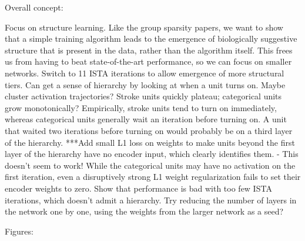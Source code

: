 Overall concept:

Focus on structure learning.  Like the group sparsity papers, we want to show that a simple training algorithm leads to the emergence of biologically suggestive structure that is present in the data, rather than the algorithm itself.  This frees us from having to beat state-of-the-art performance, so we can focus on smaller networks.  
Switch to 11 ISTA iterations to allow emergence of more structural tiers.  
Can get a sense of hierarchy by looking at when a unit turns on.  Maybe cluster activation trajectories?  Stroke units quickly plateau; categorical units grow monotonically?  Empirically, stroke units tend to turn on immediately, whereas categorical units generally wait an iteration before turning on.  A unit that waited two iterations before turning on would probably be on a third layer of the hierarchy.  
***Add small L1 loss on weights to make units beyond the first layer of the hierarchy have no encoder input, which clearly identifies them.  - This doesn't seem to work!  While the categorical units may have no activation on the first iteration, even a disruptively strong L1 weight regularization fails to set their encoder weights to zero.
Show that performance is bad with too few ISTA iterations, which doesn't admit a hierarchy.  Try reducing the number of layers in the network one by one, using the weights from the larger network as a seed?



Figures:

